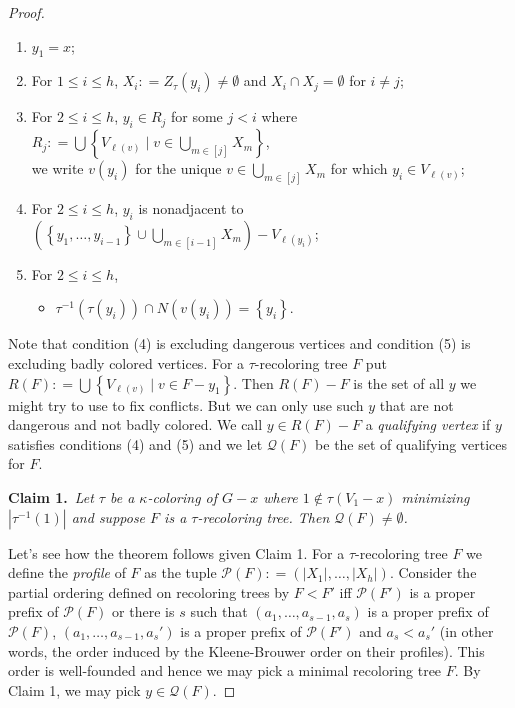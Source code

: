\documentclass[12pt]{article}
\theoremstyle{plain}
\theoremstyle{definition}
\theoremstyle{remark}
\newcommand{\fancy}[1]{\mathcal{#1}}
\newcommand{\set}[1]{\left\{ #1 \right\}}
\newcommand{\setbs}[2]{\left\{ #1 \mid #2 \right\}}
\newcommand{\card}[1]{\left|#1\right|}
\newcommand{\irange}[1]{\left[#1\right]}
\newcommand{\parens}[1]{\left( #1 \right)}
\newcommand{\DefinedAs}{\mathrel{\mathop:}=}
\newcommand{\claim}[2]{{\bf Claim #1.}~{\it #2}~~}
\begin{document}
\begin{proof}
\begin{enumerate}
\item $y_1 = x$;
\item For $1 \le i \le h$, $X_i \DefinedAs Z_{\tau}(y_i) \ne \emptyset$ and $X_i \cap X_j = \emptyset$ for $i \neq j$;
\item For $2 \le i \le h$, $y_i \in R_j$ for some $j < i$ where $R_j \DefinedAs \bigcup \setbs{V_{\ell(v)}}{v \in \bigcup_{m \in \irange{j}} X_m}$,\\
we write $v(y_i)$ for the unique $v \in \bigcup_{m \in \irange{j}} X_m$ for which $y_i \in V_{\ell(v)}$;
\item For $2 \le i \le h$, $y_i$ is nonadjacent to $\parens{\set{y_1, \ldots, y_{i-1}} \cup \bigcup_{m \in \irange{i-1}} X_m} - V_{\ell(y_i)}$;
\item For $2 \le i \le h$, 
\begin{itemize}
\item $\tau^{-1}(\tau(y_i)) \cap N(v(y_i)) = \set{y_i}$.
\end{itemize}
\end{enumerate}

Note that condition (4) is excluding dangerous vertices and condition (5) is excluding badly colored vertices. For a $\tau$-recoloring tree $F$ put $R(F) \DefinedAs  \bigcup \setbs{V_{\ell(v)}}{v \in F - y_1}$.  Then $R(F) - F$ is the set of all $y$ we might try to use to fix conflicts.  But we can only use such $y$ that are not dangerous and not badly colored.  We call $y \in R(F) - F$ a \emph{qualifying vertex} if $y$ satisfies conditions (4) and (5) and we let $\fancy{Q}(F)$ be the set of qualifying vertices for $F$.

\claim{1}{Let $\tau$ be a $\kappa$-coloring of $G-x$ where $1 \not \in \tau(V_1 - x)$ minimizing $\card{\tau^{-1}(1)}$ and suppose $F$ is a $\tau$-recoloring tree. Then $\fancy{Q}(F) \ne \emptyset$.}

\bigskip

Let's see how the theorem follows given Claim 1.  For a $\tau$-recoloring tree $F$ we define the \emph{profile} of $F$ as the tuple $\fancy{P}(F) \DefinedAs \parens{|X_1|, \ldots, |X_h|}$.  Consider the partial ordering defined on recoloring trees by $F < F'$ iff $\fancy{P}(F')$ is a proper prefix of $\fancy{P}(F)$ or there is $s$ such that $\parens{a_1, \ldots, a_{s-1}, a_s}$ is a proper prefix of $\fancy{P}(F)$, $\parens{a_1, \ldots, a_{s-1}, a_s'}$ is a proper prefix of $\fancy{P}(F')$ and $a_s < a_s'$ (in other words, the order induced by the Kleene-Brouwer order on their profiles).  This order is well-founded and hence we may pick a minimal recoloring tree $F$.  By Claim 1, we may pick $y \in \fancy{Q}(F)$.  


\end{proof}
\end{document}
